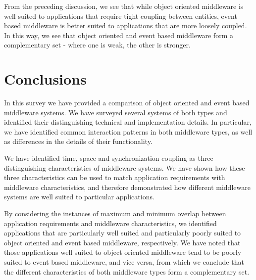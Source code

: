 \documentclass{acm_proc_article-sp}
\begin{document}
From the preceding discussion, we see that while object oriented middleware is well suited to applications that require tight coupling between entities, event based middleware is better suited to applications that are more loosely coupled. In this way, we see that object oriented and event based middleware form a complementary set - where one is weak, the other is stronger. 



\section{Conclusions}
\label{sec:conclusion}


In this survey we have provided a comparison of object oriented and event based middleware systems. We have surveyed several systems of both types and identified their distinguishing technical and implementation details. In particular, we have identified common interaction patterns in both middleware types, as well as differences in the details of their functionality. 

We have identified time, space and synchronization coupling as three distinguishing characteristics of middleware systems. We have shown how these three characteristics can be used to match application requirements with middleware characteristics, and therefore demonstrated how different middleware systems are well suited to particular applications. 

By considering the instances of maximum and minimum overlap between application requirements and middleware characteristics, we identified applications that are particularly well suited and particularly poorly suited to object oriented and event based middleware, respectively. We have noted that those applications well suited to object oriented middleware tend to be poorly suited to event based middleware, and vice versa, from which we conclude that the different characteristics of both middleware types form a complementary set.





\balancecolumns
\end{document}
